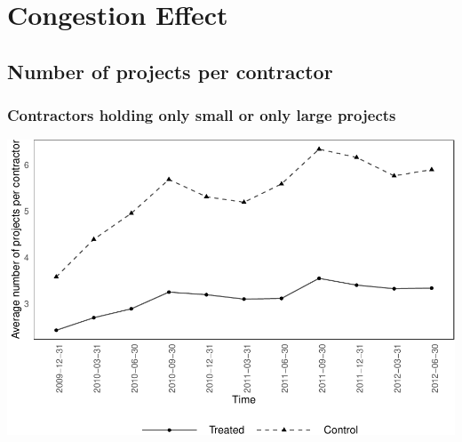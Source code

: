 \documentclass[
]{article}
\begin{document}
\hypertarget{congestion-effect}{%
\section{Congestion Effect}\label{congestion-effect}}

\hypertarget{number-of-projects-per-contractor}{%
\subsection{Number of projects per
contractor}\label{number-of-projects-per-contractor}}

\hypertarget{contractors-holding-only-small-or-only-large-projects}{%
\subsubsection{Contractors holding only small or only large
projects}\label{contractors-holding-only-small-or-only-large-projects}}

\includegraphics{qp_first_pc_delay_clean_control_time_independent_files/figure-latex/num_projects_0-1.pdf}
\end{document}

